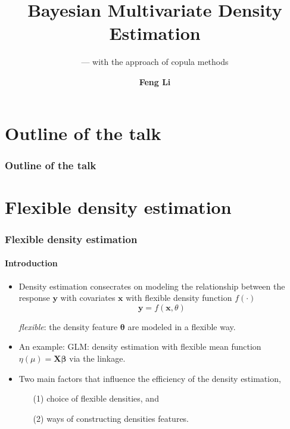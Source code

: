 \documentclass{beamer}
\title[Bayesian Multivariate Density Estimation]{{Bayesian
   Multivariate Density Estimation}}
\subtitle{\small{--- with the approach of copula methods}}
\author[Feng Li]{\textbf{Feng Li}}
\institute[Stockholm University]{\textbf{Department of
    Statistics, Stockholm University}}
\date{\color{SUblue}{ \textbf{April, 2013}}}
\begin{document}
\maketitle

\section*{Outline of the talk}
\begin{frame}
  \frametitle{Outline of the talk}
  \addtocounter{framenumber}{-1}
  \tableofcontents
\end{frame}

\section{Flexible density estimation}
\begin{frame}
  \frametitle{Flexible density estimation}
  \framesubtitle{Introduction}
  \begin{itemize}
  \item Density estimation consecrates on modeling the relationship between
the response $\bm{y}$ with covariates $\bm{x}$ with flexible density function
$f(\cdot)$
\begin{equation*}
  \label{eq:1}
  \bm{y} = f(\bm{x},{\theta})
\end{equation*}

\emph{flexible}: the density feature $\bm{\theta}$ are modeled in a flexible way.

\item An example: GLM: density estimation with flexible mean function $\eta(\mu) =
    \bm{X\beta} $ via the linkage.

\item Two main factors that influence the efficiency of the density estimation,
\begin{enumerate}
\item [(1)] choice of flexible densities, and
\item [(2)] ways of constructing densities features.
\end{enumerate}
\end{itemize}
\end{frame}
\end{document}

